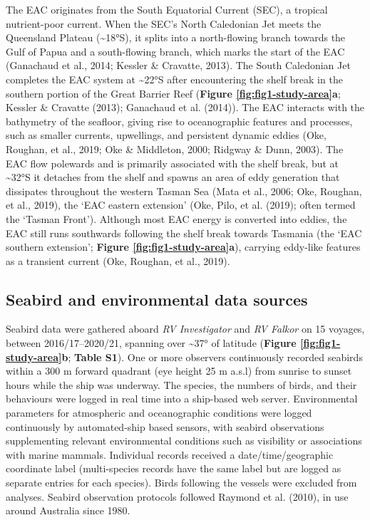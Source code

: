 \documentclass{article}
\begin{document}
\begin{linenumbers}
The EAC originates from the South Equatorial Current (SEC), a tropical nutrient-poor current. When the SEC's North Caledonian Jet meets the Queensland Plateau (\textasciitilde18°S), it splits into a north-flowing branch towards the Gulf of Papua and a south-flowing branch, which marks the start of the EAC (Ganachaud et al., 2014; Kessler \& Cravatte, 2013). The South Caledonian Jet completes the EAC system at \textasciitilde22°S after encountering the shelf break in the southern portion of the Great Barrier Reef (\textbf{Figure \ref{fig:fig1-study-area}a}; Kessler \& Cravatte (2013); Ganachaud et al. (2014)). The EAC interacts with the bathymetry of the seafloor, giving rise to oceanographic features and processes, such as smaller currents, upwellings, and persistent dynamic eddies (Oke, Roughan, et al., 2019; Oke \& Middleton, 2000; Ridgway \& Dunn, 2003). The EAC flow polewards and is primarily associated with the shelf break, but at \textasciitilde32°S it detaches from the shelf and spawns an area of eddy generation that dissipates throughout the western Tasman Sea (Mata et al., 2006; Oke, Roughan, et al., 2019), the `EAC eastern extension' (Oke, Pilo, et al. (2019); often termed the `Tasman Front'). Although most EAC energy is converted into eddies, the EAC still runs southwards following the shelf break towards Tasmania (the `EAC southern extension'; \textbf{Figure \ref{fig:fig1-study-area}a}), carrying eddy-like features as a transient current (Oke, Roughan, et al., 2019).

\hypertarget{seabird-and-environmental-data-sources}{%
\subsection{Seabird and environmental data sources}\label{seabird-and-environmental-data-sources}}

Seabird data were gathered aboard \emph{RV Investigator} and \emph{RV Falkor} on 15 voyages, between 2016/17--2020/21, spanning over \textasciitilde37° of latitude (\textbf{Figure \ref{fig:fig1-study-area}b}; \textbf{Table S1}). One or more observers continuously recorded seabirds within a 300 m forward quadrant (eye height 25 m a.s.l) from sunrise to sunset hours while the ship was underway. The species, the numbers of birds, and their behaviours were logged in real time into a ship-based web server. Environmental parameters for atmospheric and oceanographic conditions were logged continuously by automated-ship based sensors, with seabird observations supplementing relevant environmental conditions such as visibility or associations with marine mammals. Individual records received a date/time/geographic coordinate label (multi-species records have the same label but are logged as separate entries for each species). Birds following the vessels were excluded from analyses. Seabird observation protocols followed Raymond et al. (2010), in use around Australia since 1980.


\end{linenumbers}
\end{document}
